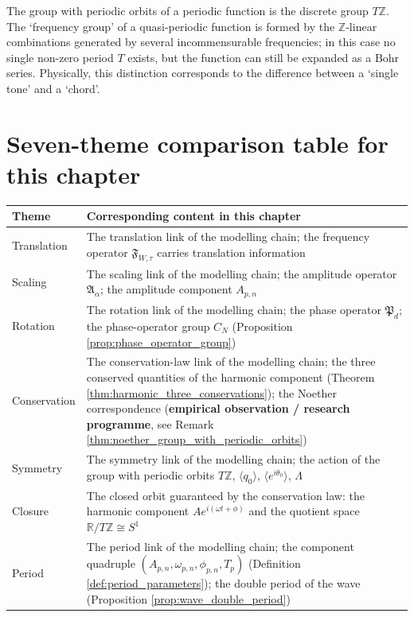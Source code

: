 \begin{remark}\label{rem:periodic_quasiperiodic}
The group with periodic orbits of a periodic function is the discrete group $T\mathbb{Z}$. The `frequency group' of a quasi-periodic function is formed by the $\mathbb{Z}$-linear combinations generated by several incommensurable frequencies; in this case no single non-zero period $T$ exists, but the function can still be expanded as a Bohr series. Physically, this distinction corresponds to the difference between a `single tone' and a `chord'.
\end{remark}

\section*{Seven-theme comparison table for this chapter}

\begin{center}
\renewcommand{\arraystretch}{1.3}
\begin{tabular}{>{\raggedright\arraybackslash}p{2.8cm}>{\raggedright\arraybackslash}p{9.9cm}}
\toprule
Theme & Corresponding content in this chapter \\
\midrule
Translation & The translation link of the modelling chain; the frequency operator $\mathfrak{F}_{W,\tau}$ carries translation information \\
Scaling & The scaling link of the modelling chain; the amplitude operator $\mathfrak{A}_\alpha$; the amplitude component $A_{p,n}$ \\
Rotation & The rotation link of the modelling chain; the phase operator $\mathfrak{P}_d$; the phase-operator group $C_N$ (Proposition \ref{prop:phase_operator_group}) \\
Conservation & The conservation-law link of the modelling chain; the three conserved quantities of the harmonic component (Theorem \ref{thm:harmonic_three_conservations}); the Noether correspondence (\textbf{empirical observation / research programme}, see Remark \ref{thm:noether_group_with_periodic_orbits}) \\
Symmetry & The symmetry link of the modelling chain; the action of the group with periodic orbits $T\mathbb{Z}$, $\langle q_0\rangle$, $\langle e^{i\theta_0}\rangle$, $\Lambda$ \\
Closure & The closed orbit guaranteed by the conservation law: the harmonic component $Ae^{i(\omega t+\phi)}$ and the quotient space $\mathbb{R}/T\mathbb{Z}\cong S^1$ \\
Period & The period link of the modelling chain; the component quadruple $(A_{p,n}, \omega_{p,n}, \phi_{p,n}, T_p)$ (Definition \ref{def:period_parameters}); the double period of the wave (Proposition \ref{prop:wave_double_period}) \\
\bottomrule
\end{tabular}
\end{center}

